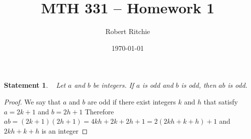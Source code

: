 \documentclass[11pt]{article}
\newtheorem{statement}{Statement}%
\begin{document}
\author{Robert Ritchie}
\title{MTH 331 -- Homework 1}
\date{\today}

\maketitle

\begin{statement}~
Let $a$ and $b$ be integers.  If $a$ is odd and $b$ is odd, then $ab$ is odd.
\end{statement}

\begin{proof}
We say that $a$ and $b$ are odd if there exist integers $k$ and $h$ that satisfy $a=2k+1$ and $b=2h+1$
Therefore $ab=(2k+1)(2h+1)=4kh+2k+2h+1=2(2kh+k+h)+1$
and $2kh+k+h$ is an integer

\end{proof}
\end{document}
